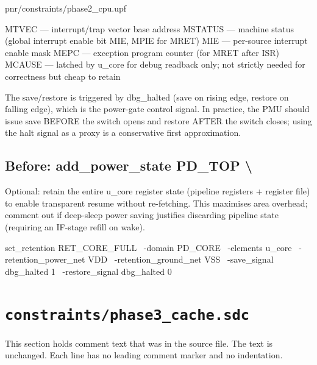 \begin{relocated}{pnr/constraints/phase2_cpu.upf}
\begin{textblock}
  MTVEC   — interrupt/trap vector base address
  MSTATUS — machine status (global interrupt enable bit MIE, MPIE for MRET)
  MIE     — per-source interrupt enable mask
  MEPC    — exception program counter (for MRET after ISR)
  MCAUSE  — latched by u_core for debug readback only; not strictly
            needed for correctness but cheap to retain

The save/restore is triggered by dbg_halted (save on rising edge,
restore on falling edge), which is the power-gate control signal.
In practice, the PMU should issue save BEFORE the switch opens and
restore AFTER the switch closes; using the halt signal as a proxy is
a conservative first approximation.
\end{textblock}

\subsection*{Before: add\_power\_state PD\_TOP \textbackslash{}}

\begin{textblock}
Optional: retain the entire u_core register state (pipeline registers +
register file) to enable transparent resume without re-fetching.
This maximises area overhead; comment out if deep-sleep power saving
justifies discarding pipeline state (requiring an IF-stage refill on wake).

set_retention RET_CORE_FULL \
    -domain          PD_CORE \
    -elements        {u_core} \
    -retention_power_net  VDD \
    -retention_ground_net VSS \
    -save_signal     {dbg_halted 1} \
    -restore_signal  {dbg_halted 0}
\end{textblock}

\end{relocated}

\section{\texttt{constraints/phase3\_cache.sdc}}\label{tm:pd:phase3-cache-sdc}

This section holds comment text that was in the source file. The text is unchanged. Each line has no leading comment marker and no indentation.

